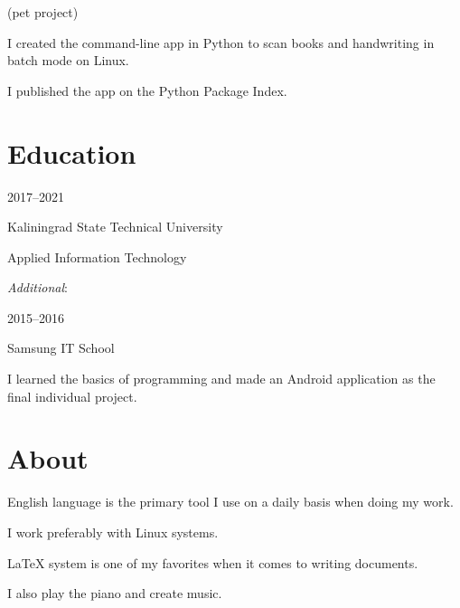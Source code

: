 \documentclass [12pt] {article}
\newcommand \CloserUnderline [1] {\underline {\smash {#1}}}
\begin{document}
\href {https://pypi.org/project/smth} {\CloserUnderline {smth}}
(pet project)

I created the command-line app in Python to scan books and handwriting in
batch mode on Linux.

I published the app on the Python Package Index.

\section {Education}

2017--2021

Kaliningrad State Technical University

Applied Information Technology

\bigskip

\emph {Additional}:

2015--2016

Samsung IT School

I learned the basics of programming
and made an Android application as the final individual project.

\section {About}

English language is the primary tool
I use on a daily basis when doing my work.

I work preferably with Linux systems.

LaTeX system is one of my favorites
when it comes to writing documents.

I also play the piano and create music.
\end{document}
